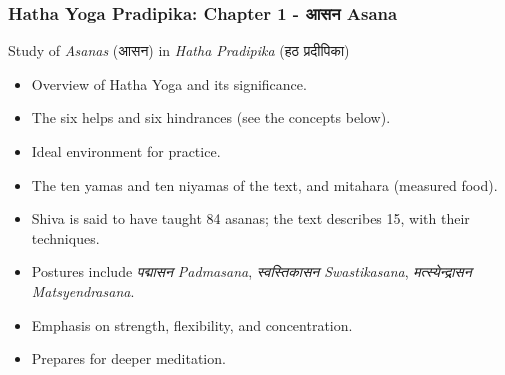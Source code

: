 \begin{frame}[fragile]\frametitle{Hatha Yoga Pradipika: Chapter 1 - आसन  Asana}

Study of \textit{Asanas} (आसन) in \textit{Hatha Pradipika} (हठ प्रदीपिका)

\begin{itemize}
    \item Overview of Hatha Yoga and its significance.
    \item The six helps and six hindrances (see the concepts below).
    \item Ideal environment for practice.
    \item The ten yamas and ten niyamas of the text, and mitahara (measured food).
    \item Shiva is said to have taught 84 asanas; the text describes 15, with their techniques.
    \item Postures include \textit{पद्मासन Padmasana}, \textit{स्वस्तिकासन Swastikasana}, \textit{मत्स्येन्द्रासन Matsyendrasana}.
    \item Emphasis on strength, flexibility, and concentration.
    \item Prepares for deeper meditation.
\end{itemize}

\end{frame}




